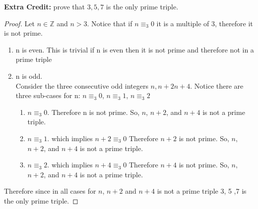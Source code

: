\documentclass{article}
\newcommand{\Z}{\mathbb{Z}}
\begin{document}
	\textbf{Extra Credit:}
		prove that $3, 5, 7$ is the only prime triple.
		\begin{proof}
			Let $n\in \Z$ and $n > 3$. Notice that if $n \equiv_3 0 $ it is a multiple of 3, therefore it is not prime.
			\begin{enumerate}[label= Case \arabic*:]
				\item n is even. This is trivial if n is even then it is not prime and therefore not in a prime triple
				\item n is odd. \\  
				Consider the three consecutive odd integers $n, n+2 n+4$. Notice there are three sub-cases for n: $n \equiv_3 0$, $n \equiv_3 1$, $n \equiv_3 2$
				\begin{enumerate}[label= Subcase \arabic*:]
				\item $n \equiv_3 0$. Therefore n is not prime. So, $n$, $n+2$, and $n+4$ is not a prime triple.
				\item $n \equiv_3 1$. which implies $n+2 \equiv_3 0$ Therefore $n+2$ is not prime. So, $n$, $n+2$, and $n+4$ is not a prime triple.
				\item $n \equiv_3 2$. which implies $n+4 \equiv_3 0$ Therefore $n+4$ is not prime. So, $n$, $n+2$, and $n+4$ is not a prime triple. 
				\end{enumerate}	
			\end{enumerate}
			Therefore since in all cases for $n$, $n+2$ and $n+4$ is not a prime triple 3, 5 ,7 is the only prime triple.
			
		\end{proof}
			
\end{document}
